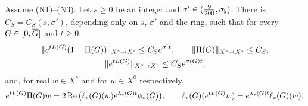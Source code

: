 \begin{proposition}
\label{prop:semigroup}
Assume \textup{(N1)}--\textup{(N3)}. Let $s\ge0$ be an integer and
$\sigma'\in(\frac9{200},\sigma_\flat)$. There is $C_S=C_S(s,\sigma')$, depending only on
$s$, $\sigma'$ and the ring, such that for every $G\in[0,\overline{G}]$ and $t\ge0$:
\[
\begin{gathered}
\|e^{tL(G)}(1-\Pi(G))\|_{X^s\to X^s}\le C_Se^{\sigma't},\qquad
\|\Pi(G)\|_{X^s\to X^s}\le C_S,\\
\|e^{tL(G)}\|_{X^s\to X^s}\le C_Se^{\sigma(G)t},
\end{gathered}
\]
and, for real $w\in X^s$ and for $w\in X^0$ respectively,
\[
e^{tL(G)}\Pi(G)w=2\Re\big(\ell_*(G)(w)e^{\lambda_*(G)t}\phi_*(G)\big),\qquad
\ell_*(G)(e^{tL(G)}w)=e^{\lambda_*(G)t}\ell_*(G)(w).
\]
\end{proposition}
